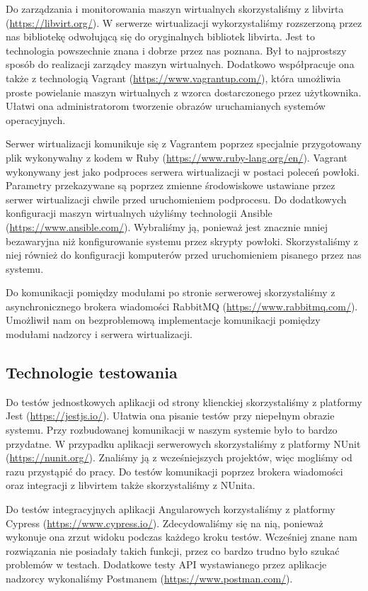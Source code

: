 \documentclass[../opis-rozwiazania.tex]{subfiles}
\begin{document}
Do zarządzania i monitorowania maszyn wirtualnych skorzystaliśmy z libvirta (\url{https://libvirt.org/}).
W serwerze wirtualizacji wykorzystaliśmy rozszerzoną przez nas bibliotekę odwołującą się do oryginalnych bibliotek libvirta.
Jest to technologia powszechnie znana i dobrze przez nas poznana. Był to najprostszy sposób do realizacji zarządcy maszyn wirtualnych.
Dodatkowo współpracuje ona także z technologią Vagrant (\url{https://www.vagrantup.com/}), która umożliwia proste powielanie maszyn wirtualnych z wzorca dostarczonego przez użytkownika.
Ułatwi ona administratorom tworzenie obrazów uruchamianych systemów operacyjnych.

Serwer wirtualizacji komunikuje się z Vagrantem poprzez specjalnie przygotowany plik wykonywalny z kodem w Ruby (\url{https://www.ruby-lang.org/en/}).
Vagrant wykonywany jest jako podproces serwera wirtualizacji w postaci poleceń powłoki.
Parametry przekazywane są poprzez zmienne środowiskowe ustawiane przez serwer wirtualizacji chwile przed uruchomieniem podprocesu.
Do dodatkowych konfiguracji maszyn wirtualnych użyliśmy technologii Ansible (\url{https://www.ansible.com/}).
Wybraliśmy ją, ponieważ jest znacznie mniej bezawaryjna niż konfigurowanie systemu przez skrypty powłoki.
Skorzystaliśmy z niej również do konfiguracji komputerów przed uruchomieniem pisanego przez nas systemu.

Do komunikacji pomiędzy modułami po stronie serwerowej skorzystaliśmy z asynchronicznego brokera wiadomości RabbitMQ (\url{https://www.rabbitmq.com/}).
Umożliwił nam on bezproblemową implementacje komunikacji pomiędzy modułami nadzorcy i serwera wirtualizacji.

\subsection{Technologie testowania}
Do testów jednostkowych aplikacji od strony klienckiej skorzystaliśmy z platformy Jest (\url{https://jestjs.io/}).
Ułatwia ona pisanie testów przy niepełnym obrazie systemu. Przy rozbudowanej komunikacji w naszym systemie było to bardzo przydatne.
W przypadku aplikacji serwerowych skorzystaliśmy z platformy NUnit (\url{https://nunit.org/}).
Znaliśmy ją z wcześniejszych projektów, więc mogliśmy od razu przystąpić do pracy.
Do testów komunikacji poprzez brokera wiadomości oraz integracji z libvirtem także skorzystaliśmy z NUnita.

Do testów integracyjnych aplikacji Angularowych korzystaliśmy z platformy Cypress (\url{https://www.cypress.io/}).
Zdecydowaliśmy się na nią, ponieważ wykonuje ona zrzut widoku podczas każdego kroku testów.
Wcześniej znane nam rozwiązania nie posiadały takich funkcji, przez co bardzo trudno było szukać problemów w testach.
Dodatkowe testy API wystawianego przez aplikacje nadzorcy wykonaliśmy Postmanem (\url{https://www.postman.com/}).
\end{document}
